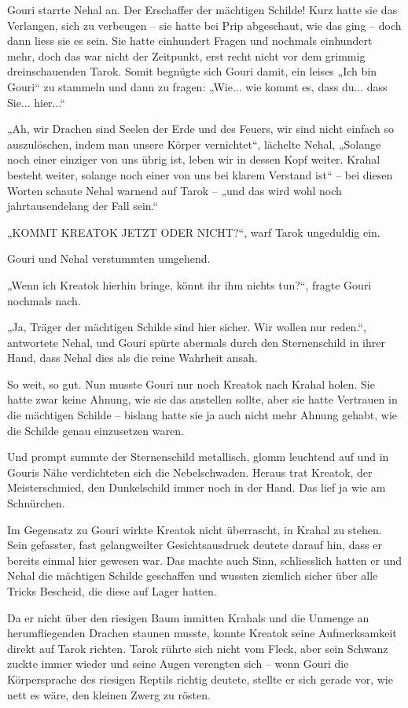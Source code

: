 \documentclass[10pt, a4paper, oneside]{book}
\begin{document}
Gouri starrte Nehal an. Der Erschaffer der mächtigen Schilde! Kurz hatte sie das Verlangen, sich zu verbeugen – sie hatte bei Prip abgeschaut, wie das ging – doch dann liess sie es sein. Sie hatte einhundert Fragen und nochmals einhundert mehr, doch das war nicht der Zeitpunkt, erst recht nicht vor dem grimmig dreinschauenden Tarok. Somit begnügte sich Gouri damit, ein leises „Ich bin Gouri“ zu stammeln und dann zu fragen: „Wie... wie kommt es, dass du... dass Sie... hier...“

„Ah, wir Drachen sind Seelen der Erde und des Feuers, wir sind nicht einfach so auszulöschen, indem man unsere Körper vernichtet“, lächelte Nehal, „Solange noch einer einziger von uns übrig ist, leben wir in dessen Kopf weiter. Krahal besteht weiter, solange noch einer von uns bei klarem Verstand ist“ – bei diesen Worten schaute Nehal warnend auf Tarok – „und das wird wohl noch jahrtausendelang der Fall sein.“

„KOMMT KREATOK JETZT ODER NICHT?“, warf Tarok ungeduldig ein.

Gouri und Nehal verstummten umgehend.

„Wenn ich Kreatok hierhin bringe, könnt ihr ihm nichts tun?“, fragte Gouri nochmals nach.

„Ja, Träger der mächtigen Schilde sind hier sicher. Wir wollen nur reden.“, antwortete Nehal, und Gouri spürte abermals durch den Sternenschild in ihrer Hand, dass Nehal dies als die reine Wahrheit ansah.

So weit, so gut. Nun musste Gouri nur noch Kreatok nach Krahal holen. Sie hatte zwar keine Ahnung, wie sie das anstellen sollte, aber sie hatte Vertrauen in die mächtigen Schilde – bislang hatte sie ja auch nicht mehr Ahnung gehabt, wie die Schilde genau einzusetzen waren.

Und prompt summte der Sternenschild metallisch, glomm leuchtend auf und in Gouris Nähe verdichteten sich die Nebelschwaden. Heraus trat Kreatok, der Meisterschmied, den Dunkelschild immer noch in der Hand. Das lief ja wie am Schnürchen.

Im Gegensatz zu Gouri wirkte Kreatok nicht überrascht, in Krahal zu stehen. Sein gefasster, fast gelangweilter Gesichtsausdruck deutete darauf hin, dass er bereits einmal hier gewesen war. Das machte auch Sinn, schliesslich hatten er und Nehal die mächtigen Schilde geschaffen und wussten ziemlich sicher über alle Tricks Bescheid, die diese auf Lager hatten.

Da er nicht über den riesigen Baum inmitten Krahals und die Unmenge an herumfliegenden Drachen staunen musste, konnte Kreatok seine Aufmerksamkeit direkt auf Tarok richten. Tarok rührte sich nicht vom Fleck, aber sein Schwanz zuckte immer wieder und seine Augen verengten sich – wenn Gouri die Körpersprache des riesigen Reptils richtig deutete, stellte er sich gerade vor, wie nett es wäre, den kleinen Zwerg zu rösten.
\end{document}
